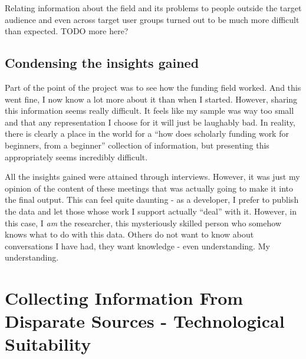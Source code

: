 Relating information about the field and its problems to people outside the target audience and even across target user groups turned out to be much more difficult than expected. TODO more here?

\subsection{Condensing the insights gained}
Part of the point of the project was to see how the funding field worked. And this went fine, I now know a lot more about it than when I started. However, sharing this information seems really difficult. It feels like my sample was way too small and that any representation I choose for it will just be laughably bad. In reality, there is clearly a place in the world for a ``how does scholarly funding work for beginners, from a beginner'' collection of information, but presenting this appropriately seems incredibly difficult.

All the insights gained were attained through interviews. However, it was just my opinion of the content of these meetings that was actually going to make it into the final output. This can feel quite daunting - as a developer, I prefer to publish the data and let those whose work I support actually ``deal'' with it. However, in this case, I \emph{am} the researcher, this mysteriously skilled person who somehow knows what to do with this data. Others do not want to know about conversations I have had, they want knowledge - even understanding. My understanding. %


\section{Collecting Information From Disparate Sources - Technological Suitability}

